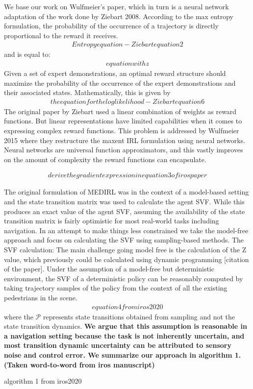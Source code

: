 We base our work on Wulfmeier's paper, which in turn is a neural network adaptation of the work done by Ziebart 2008. 
According to the max entropy formulation, the probability of the occurrence of a trajectory is directly proportional to the reward it receives.
\begin{align}
Entropy equation - Ziebart equation 2
\end{align}
and is equal to:
\begin{align}
equation with z
\end{align}
Given a set of expert demonstrations, an optimal reward structure should maximize the probability of the occurrence of the expert demonstrations and their associated states. Mathematically, this is given by 
\begin{align}
the equation for the loglikelihood-Ziebart equation 6
\end{align}
The original paper by Ziebart used a linear combination of weights as reward functions. But linear representations have limited capabilities when it comes to expressing complex reward functions. This problem is addressed by Wulfmeier 2015 where they restructure the maxent IRL formulation using neural networks. Neural networks are universal function approximators, and this vastly improves on the amount of complexity the reward functions can encapsulate.

\begin{align}
derive the gradient expression in equation 3 of iros paper
\end{align}

The original formulation of MEDIRL was in the context of a model-based setting and the state transition matrix was used to calculate the agent SVF. While this produces an exact value of the agent SVF, assuming the availability of the state transition matrix is fairly optimistic for most real-world tasks including navigation. In an attempt to make things less constrained we take the model-free approach and focus on calculating the SVF using sampling-based methods. 
The SVF calculation:
The main challenge going model free is the calculation of the Z value, which previously could be calculated using dynamic programming [citation of the paper]. 
Under the assumption of a model-free but deterministic environment, the SVF of a deterministic policy can be reasonably computed by taking trajectory samples of the policy from the context of all the existing pedestrians in the scene. 
\begin{align}
equation 4 from iros2020
\end{align}
where the $\mathcal{P}$ represents state transitions obtained from sampling and not the state transition dynamics. \textbf{We argue that this assumption is reasonable in a navigation setting because the task is not inherently uncertain, and most transition dynamic uncertainty can be attributed to sensory noise and control error. We summarize our approach in algorithm 1. (Taken word-to-word from iros manuscript)}
\begin{algorithm}
	algorithm 1 from iros2020
\end{algorithm}

